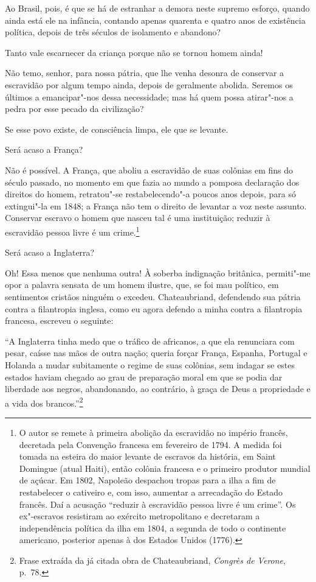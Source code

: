 \begin{linenumbers}
 Ao Brasil, pois, é que se há de estranhar a demora neste supremo
esforço, quando ainda está ele na infância, contando apenas quarenta e
quatro anos de existência política, depois de três séculos de
isolamento e abandono? 

 Tanto vale escarnecer da criança porque não se tornou homem ainda!

 Não temo, senhor, para nossa pátria, que lhe venha desonra de conservar
a escravidão por algum tempo ainda, depois de geralmente abolida.
Seremos os últimos a emancipar"-nos dessa necessidade; mas há quem
possa atirar"-nos a pedra por esse pecado da civilização?

 Se esse povo existe, de consciência limpa, ele que se levante.

 Será acaso a França?

 Não é possível. A França, que aboliu a escravidão de suas colônias em
fins do século passado, no momento em que fazia ao mundo a pomposa
declaração dos direitos do homem, retratou"-se restabelecendo"-a
poucos anos depois, para só extingui"-la em 1848; a França não tem o
direito de levantar a voz neste assunto. Conservar escravo o homem que
nasceu tal é uma instituição; reduzir à escravidão pessoa livre é um
crime.\footnote{ O autor se remete à primeira abolição da escravidão no império francês, decretada
pela Convenção francesa em fevereiro de 1794. A medida foi tomada na
esteira do maior levante de escravos da história, em Saint Domingue
(atual Haiti), então colônia francesa e o primeiro produtor mundial de
açúcar. Em 1802, Napoleão despachou tropas para a ilha a fim de
restabelecer o cativeiro e, com isso, aumentar a arrecadação do Estado
francês. Daí a acusação ``reduzir à escravidão pessoa livre é um crime''.
Os ex"-escravos resistiram ao exército metropolitano e decretaram a
independência política da ilha em 1804, a segunda de todo o continente
americano, posterior apenas à dos Estados Unidos (1776).}
 
Será acaso a Inglaterra?

Oh! Essa menos que nenhuma outra! À soberba indignação britânica,
permiti"-me opor a palavra sensata de um homem ilustre, que, se foi
mau político, em sentimentos cristãos ninguém o excedeu. Chateaubriand,
defendendo sua pátria contra a filantropia inglesa, como eu agora
defendo a minha contra a filantropia francesa, escreveu o seguinte: 

 ``A Inglaterra tinha medo que o tráfico de africanos, a que ela
renunciara com pesar, caísse nas mãos de outra nação; queria forçar
França, Espanha, Portugal e Holanda a mudar subitamente o regime de
suas colônias, sem indagar se estes estados haviam chegado ao grau de
preparação moral em que se podia dar liberdade aos negros, abandonando,
ao contrário, à graça de Deus a propriedade e a vida dos
brancos.''\footnote{ Frase extraída da já citada obra de Chateaubriand, 
\textit{Congrès de Verone}, p.~78.}
 


\end{linenumbers}
